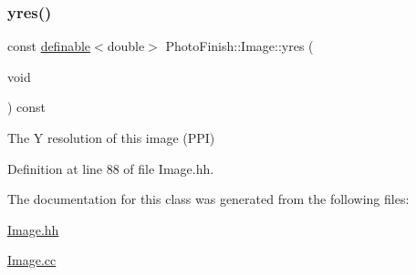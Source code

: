 \subsubsection{\texorpdfstring{yres()}{yres()}}
{\footnotesize\ttfamily const \hyperlink{class_photo_finish_1_1definable}{definable}$<$double$>$ Photo\+Finish\+::\+Image\+::yres (\begin{DoxyParamCaption}\item[{void}]{ }\end{DoxyParamCaption}) const\hspace{0.3cm}{\ttfamily [inline]}}



The Y resolution of this image (P\+PI) 



Definition at line 88 of file Image.\+hh.



The documentation for this class was generated from the following files\+:\begin{DoxyCompactItemize}
\item 
\hyperlink{_image_8hh}{Image.\+hh}\item 
\hyperlink{_image_8cc}{Image.\+cc}\end{DoxyCompactItemize}
